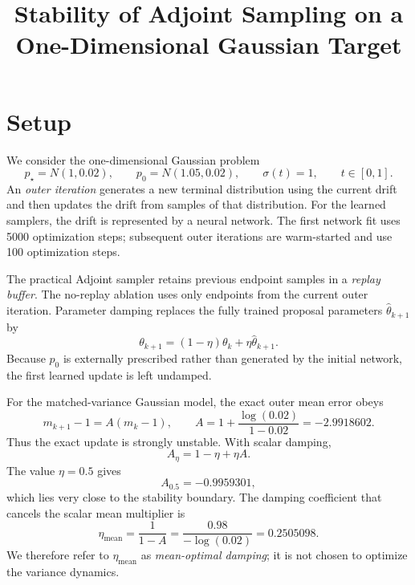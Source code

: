 \documentclass[10pt]{article}
\title{\vspace{-1.5em}
Stability of Adjoint Sampling on a One-Dimensional Gaussian Target
\vspace{-0.5em}}
\author{}
\date{}
\newcommand{\pstar}{p_{\star}}
\newcommand{\etaopt}{\eta_{\mathrm{mean}}}
\begin{document}
\maketitle
\vspace{-2em}

\section{Setup}

We consider the one-dimensional Gaussian problem
\[
\pstar = N(1,0.02),
\qquad
p_0 = N(1.05,0.02),
\qquad
\sigma(t)=1,
\qquad t\in[0,1].
\]
An \emph{outer iteration} generates a new terminal distribution using the
current drift and then updates the drift from samples of that distribution.
For the learned samplers, the drift is represented by a neural network.
The first network fit uses 5000 optimization steps; subsequent outer
iterations are warm-started and use 100 optimization steps.

The practical Adjoint sampler retains previous endpoint samples in a
\emph{replay buffer}.  The no-replay ablation uses only endpoints from the
current outer iteration.  Parameter damping replaces the fully trained
proposal parameters $\widehat{\theta}_{k+1}$ by
\[
\theta_{k+1}
=
(1-\eta)\theta_k+\eta\widehat{\theta}_{k+1}.
\]
Because $p_0$ is externally prescribed rather than generated by the initial
network, the first learned update is left undamped.

For the matched-variance Gaussian model, the exact outer mean error obeys
\[
m_{k+1}-1
=
A(m_k-1),
\qquad
A
=
1+\frac{\log(0.02)}{1-0.02}
=
-2.9918602.
\]
Thus the exact update is strongly unstable.  With scalar damping,
\[
A_{\eta}
=
1-\eta+\eta A.
\]
The value $\eta=0.5$ gives
\[
A_{0.5}=-0.9959301,
\]
which lies very close to the stability boundary.  The damping coefficient
that cancels the scalar mean multiplier is
\[
\etaopt
=
\frac{1}{1-A}
=
\frac{0.98}{-\log(0.02)}
=
0.2505098.
\]
We therefore refer to $\etaopt$ as \emph{mean-optimal damping}; it is not
chosen to optimize the variance dynamics.
\end{document}
